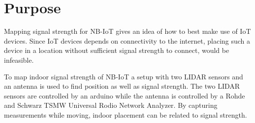 \documentclass[a4paper,twoside, 12pt]{article}
\begin{document}
\section{Purpose}
Mapping signal strength for NB-IoT gives an idea of how to best make use of IoT devices. Since IoT devices depends on connectivity to the internet, placing such a device in a location without sufficient signal strength to connect, would be infeasible. 

To map indoor signal strength of NB-IoT a setup with two LIDAR sensors and an antenna is used to find position as well as signal strength. The two LIDAR sensors are controlled by an arduino while the antenna is controlled by a Rohde and Schwarz TSMW Universal Rodio Network Analyzer. By capturing measurements while moving, indoor placement can be related to signal strength.
\end{document}
